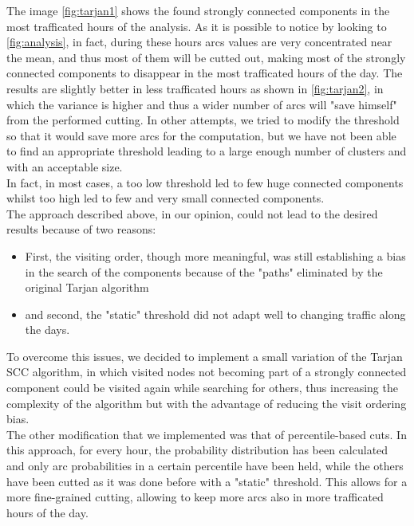 \documentclass[12pt,a4paper]{article}
\begin{document}
The image \ref{fig:tarjan1} shows the found strongly connected components in the most trafficated hours 
of the analysis. As it is possible to notice by looking to \ref{fig:analysis}, in fact, during
these hours arcs values are very concentrated near the mean, and thus most of them will be cutted out, making
most of the strongly connected components to disappear in the most trafficated hours of the day.
The results are slightly better in less trafficated hours as shown in \ref{fig:tarjan2}, in which the variance is higher and thus a wider number
of arcs will "save himself" from the performed cutting.
In other attempts, we tried to modify the threshold so that it would save more arcs for the computation,
but we have not been able to find an appropriate threshold leading to a large enough number of clusters
and with an acceptable size.\\
In fact, in most cases, a too low threshold led to few huge connected components whilst too high led to few and very small
connected components.\\
The approach described above, in our opinion, could not lead to the desired results because of two reasons:
\begin{itemize}
\item First, the visiting order, though more meaningful, was still establishing a bias in the search of the components because
of the "paths" eliminated by the original Tarjan algorithm
\item and second, the "static" threshold did not adapt well to changing traffic along the days.
\end{itemize}
To overcome this issues, we decided to implement a small variation of the Tarjan SCC algorithm, in which visited nodes not
becoming part of a strongly connected component could be visited again while searching for others, thus increasing the
complexity of the algorithm but with the advantage of reducing the visit ordering bias.
\\
The other modification that we implemented was that of percentile-based cuts. In this approach, for every hour, the probability
distribution has been calculated and only arc probabilities in a certain percentile have been held, while the others
have been cutted as it was done before with a "static" threshold. This allows for a more fine-grained cutting, allowing
to keep more arcs also in more trafficated hours of the day.
\end{document}
